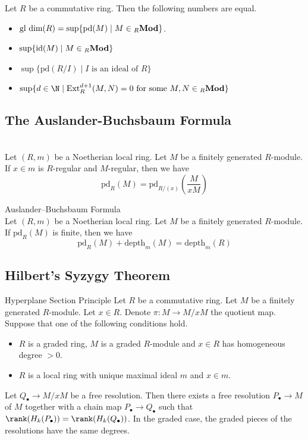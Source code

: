 \documentclass[a4paper]{article}
\begin{document}
\begin{prp}{}{} Let $R$ be a commutative ring. Then the following numbers are equal. 
\begin{itemize}
\item $\text{gl dim}(R)=\sup\{\text{pd}(M)\;|\;M\in{_R\bold{Mod}}\}$. 
\item $\sup\{\text{id}(M)\;|\;M\in{_R\bold{Mod}}\}$
\item $\sup\{\text{pd}(R/I)\;|\;I\text{ is an ideal of }R\}$
\item $\sup\{d\in\N\;|\;\text{Ext}_R^{d+1}(M,N)=0\text{ for some }M,N\in{_R\bold{Mod}}\}$
\end{itemize}
\end{prp}

\subsection{The Auslander-Buchsbaum Formula}
\begin{lmm}{}{}\\
Let $(R,m)$ be a Noetherian local ring. Let $M$ be a finitely generated $R$-module. If $x\in m$ is $R$-regular and $M$-regular, then we have $$\text{pd}_R(M)=\text{pd}_{R/(x)}\left(\frac{M}{xM}\right)$$
\end{lmm}

\begin{thm}{Auslander–Buchsbaum Formula}{}\\
Let $(R,m)$ be a Noetherian local ring. Let $M$ be a finitely generated $R$-module. If $\text{pd}_R(M)$ is finite, then we have $$\text{pd}_R(M)+\text{depth}_m(M)=\text{depth}_m(R)$$
\end{thm}

\subsection{Hilbert's Syzygy Theorem}
\begin{lmm}{Hyperplane Section Principle}{} Let $R$ be a commutative ring. Let $M$ be a finitely generated $R$-module. Let $x\in R$. Denote $\pi:M\to M/xM$ the quotient map. Suppose that one of the following conditions hold. 
\begin{itemize}
\item $R$ is a graded ring, $M$ is a graded $R$-module and $x\in R$ has homogeneous degree $>0$. 
\item $R$ is a local ring with unique maximal ideal $m$ and $x\in m$. 
\end{itemize}
Let $Q_\bullet\to M/xM$ be a free resolution. Then there exists a free resolution $P_\bullet\to M$ of $M$ together with a chain map $P_\bullet\to Q_\bullet$ such that $\rank(H_k(P_\bullet))=\rank(H_k(Q_\bullet))$. In the graded case, the graded pieces of the resolutions have the same degrees. 
\end{lmm}
\end{document}
